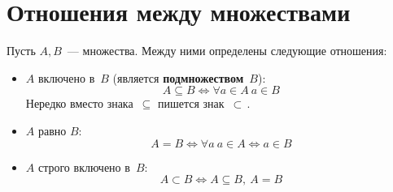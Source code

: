 \section{Отношения между множествами}
Пусть $A, B$~--- множества. Между ними определены следующие отношения:
\begin{itemize}
	\item $A$ включено в~$B$ (является \textbf{подмножеством}~$B$):
	\begin{equation*}
	A \subseteq B \Leftrightarrow \forall a \in A \ a \in B
	\end{equation*}
	Нередко вместо знака~$\subseteq$ пишется знак~$\subset$\,.
	
	\item $A$ равно $B$:
	\begin{equation*}
	A = B \Leftrightarrow \forall a \ a \in A \Leftrightarrow a \in B
	\end{equation*}
	
	\item $A$ строго включено в~$B$:
	\begin{equation*}
	A \subset B \Leftrightarrow A \subseteq B, \ A = B
	\end{equation*}
\end{itemize}
